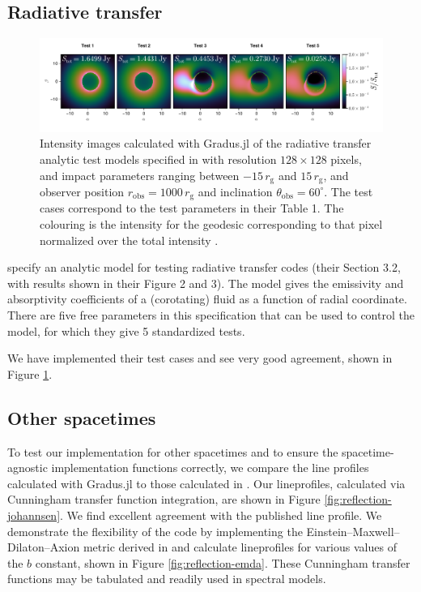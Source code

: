 \documentclass[fleqn,usenatbib]{mnras}
\newcommand{\Gradus}{{\sc Gradus.jl}\xspace}
\newcommand{\rg}{r_\text{g}}
\begin{document}
\subsection{Radiative transfer}

\begin{figure}
    \centering
    \includegraphics[width=0.99\linewidth]{figures/radiative-transfer.gold.pdf}
    \caption{Intensity images calculated with \Gradus of the radiative transfer
    analytic test models specified in \citet{gold_verification_2020} with
    resolution $128 \times 128$ pixels, and impact parameters ranging between $-15\,
    \rg$ and $15\, \rg$, and observer position $r_\text{obs} = 1000\, \rg$ and
    inclination $\theta_\text{obs} = 60^\circ$. The test cases correspond to the
    test parameters in their Table 1. The colouring is the intensity for the
    geodesic corresponding to that pixel normalized over the total intensity .}
    \label{fig:gold-test-problems}
\end{figure}

\cite{gold_verification_2020} specify an analytic model for testing radiative
transfer codes (their Section 3.2, with results shown in their Figure 2 and 3).
The model gives the emissivity and absorptivity coefficients of a (corotating)
fluid as a function of radial coordinate. There are five free parameters in this
specification that can be used to control the model, for which they give 5
standardized tests.

We have implemented their test cases and see very good agreement, shown in
Figure \ref{fig:gold-test-problems}.

\subsection{Other spacetimes}

To test our implementation for other spacetimes and to ensure the
spacetime-agnostic implementation functions correctly, we compare the line
profiles calculated with \Gradus to those calculated in
\citet{johannsen_testing_2013}. Our lineprofiles, calculated via Cunningham
transfer function integration, are shown in Figure
\ref{fig:reflection-johannsen}. We find excellent agreement with the published
line profile. We demonstrate the flexibility
of the code by implementing the Einstein--Maxwell--Dilaton--Axion metric derived
in \citet{garcia_class_1995} and calculate lineprofiles for various values of
the $b$ constant, shown in Figure \ref{fig:reflection-emda}. These Cunningham
transfer functions may be tabulated and readily used in spectral models.
\end{document}
